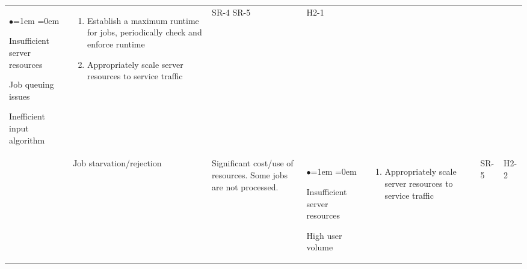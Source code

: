 \documentclass{article}
\begin{document}
\begin{table}[H]
\begin{tabularx}{\textwidth}{|P{2cm}|P{2cm}|P{2cm}|P{2cm}|P{3.45cm}|P{1cm}|P{1cm}|}
\begin{list}{$\bullet$}{\leftmargin=1em \itemindent=0em}
            \item Insufficient server resources
            \item Job queuing issues
            \item Inefficient input algorithm
        \end{list}
        & 
        \begin{enumerate}[label=(\alph*)]{\leftmargin=1em \itemindent=0em}
            \item Establish a maximum runtime for jobs, periodically check and enforce runtime
            \item Appropriately scale server resources to service traffic
        \end{enumerate}
        & SR-4 SR-5 & H2-1\\
        & Job starvation/rejection & Significant cost/use of resources. Some jobs are not processed. & 
        \begin{list}{$\bullet$}{\leftmargin=1em \itemindent=0em}
            \item Insufficient server resources
            \item High user volume
        \end{list}
        & 
        \begin{enumerate}[label=(\alph*)]{\leftmargin=1em \itemindent=0em}
            \item Appropriately scale server resources to service traffic
        \end{enumerate}
        & SR-5 & H2-2\\
        \hline
    \end{tabularx}
\end{table}
\end{document}
